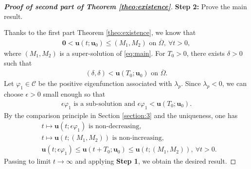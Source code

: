 \documentclass[a4paper,11pt]{amsart}
\theoremstyle{definition}
\def\O{\Omega}
\numberwithin{equation}{section}
\theoremstyle{definition}
\def\O{\Omega}
\begin{document}
\begin{proof}[\bf Proof of second part of Theorem \ref{theo:existence}]


\textbf{Step 2:} Prove the main result.

Thanks to the first part Theorem \ref{theo:existence}, we know that
\begin{align*}
\textbf{0}<\textbf{u}(t;\textbf{u}_0)\leq (M_1,M_2) \text{ on }\overline{\O},~\forall t>0,
\end{align*}
where $(M_1,M_2)$ is a super-solution of \eqref{eq:main}. For $T_0>0$, there exists $\delta>0$ such that
\begin{align*}
(\delta,\delta)< \textbf{u}(T_0;\textbf{u}_0)\text{ on }\overline{\O}.
\end{align*}
Let $\varphi_1\in \mathcal{C}$ be the positive eigenfunction associated with $\lambda_p$. Since $\lambda_p<0$,  we can choose $\epsilon>0$ small enough so that
\begin{align*}
\epsilon \varphi_1\text{ is a sub-solution and }\epsilon \varphi_1<\textbf{u}(T_0;\textbf{u}_0).
\end{align*}
By the comparison principle in Section \ref{section:3} and the uniqueness, one has
\begin{align*}
&t\mapsto \textbf{u}(t;\epsilon \varphi_1) \text{ is non-decreasing},\\
&t\mapsto \textbf{u}(t; (M_1,M_2)) \text{ is non-increasing},\\
&\textbf{u}(t;\epsilon \varphi_1)\leq \textbf{u}(t+T_0;\textbf{u}_0)\leq \textbf{u}(t;(M_1,M_2)),~\forall t>0.
\end{align*}
Passing to limit $t\rightarrow \infty$ and applying \textbf{Step 1}, we obtain the desired result.



\end{proof}
\end{document}
